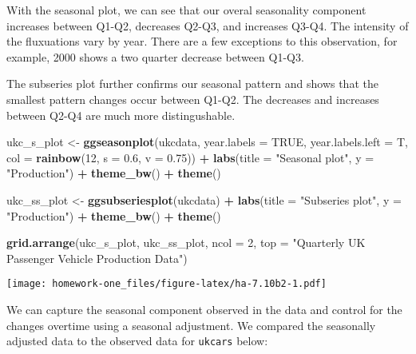\documentclass[openany]{book}
\newenvironment{Shaded}{\begin{snugshade}}{\end{snugshade}}
\newcommand{\DataTypeTok}[1]{\textcolor[rgb]{0.13,0.29,0.53}{#1}}
\newcommand{\DecValTok}[1]{\textcolor[rgb]{0.00,0.00,0.81}{#1}}
\newcommand{\FloatTok}[1]{\textcolor[rgb]{0.00,0.00,0.81}{#1}}
\newcommand{\KeywordTok}[1]{\textcolor[rgb]{0.13,0.29,0.53}{\textbf{#1}}}
\newcommand{\NormalTok}[1]{#1}
\newcommand{\OperatorTok}[1]{\textcolor[rgb]{0.81,0.36,0.00}{\textbf{#1}}}
\newcommand{\OtherTok}[1]{\textcolor[rgb]{0.56,0.35,0.01}{#1}}
\newcommand{\StringTok}[1]{\textcolor[rgb]{0.31,0.60,0.02}{#1}}
\begin{document}
With the seasonal plot, we can see that our overal seasonality component increases between Q1-Q2, decreases Q2-Q3, and increases Q3-Q4. The intensity of the fluxuations vary by year. There are a few exceptions to this observation, for example, 2000 shows a two quarter decrease between Q1-Q3.

The subseries plot further confirms our seasonal pattern and shows that the smallest pattern changes occur between Q1-Q2. The decreases and increases between Q2-Q4 are much more distingushable.

\begin{Shaded}
\begin{Highlighting}[]
\NormalTok{ukc_s_plot <-}\StringTok{ }\KeywordTok{ggseasonplot}\NormalTok{(ukcdata, }\DataTypeTok{year.labels =} \OtherTok{TRUE}\NormalTok{, }\DataTypeTok{year.labels.left =}\NormalTok{ T, }
  \DataTypeTok{col =} \KeywordTok{rainbow}\NormalTok{(}\DecValTok{12}\NormalTok{, }\DataTypeTok{s =} \FloatTok{0.6}\NormalTok{, }\DataTypeTok{v =} \FloatTok{0.75}\NormalTok{)) }\OperatorTok{+}\StringTok{ }\KeywordTok{labs}\NormalTok{(}\DataTypeTok{title =} \StringTok{"Seasonal plot"}\NormalTok{, }
  \DataTypeTok{y =} \StringTok{"Production"}\NormalTok{) }\OperatorTok{+}\StringTok{ }\KeywordTok{theme_bw}\NormalTok{() }\OperatorTok{+}\StringTok{ }\KeywordTok{theme}\NormalTok{()}

\NormalTok{ukc_ss_plot <-}\StringTok{ }\KeywordTok{ggsubseriesplot}\NormalTok{(ukcdata) }\OperatorTok{+}\StringTok{ }\KeywordTok{labs}\NormalTok{(}\DataTypeTok{title =} \StringTok{"Subseries plot"}\NormalTok{, }
  \DataTypeTok{y =} \StringTok{"Production"}\NormalTok{) }\OperatorTok{+}\StringTok{ }\KeywordTok{theme_bw}\NormalTok{() }\OperatorTok{+}\StringTok{ }\KeywordTok{theme}\NormalTok{()}

\KeywordTok{grid.arrange}\NormalTok{(ukc_s_plot, ukc_ss_plot, }\DataTypeTok{ncol =} \DecValTok{2}\NormalTok{, }\DataTypeTok{top =} \StringTok{"Quarterly UK Passenger Vehicle Production Data"}\NormalTok{)}
\end{Highlighting}
\end{Shaded}

\texttt{[image: homework-one\_files/figure-latex/ha-7.10b2-1.pdf]}

We can capture the seasonal component observed in the data and control for the changes overtime using a seasonal adjustment. We compared the seasonally adjusted data to the observed data for \texttt{ukcars} below:
\end{document}
